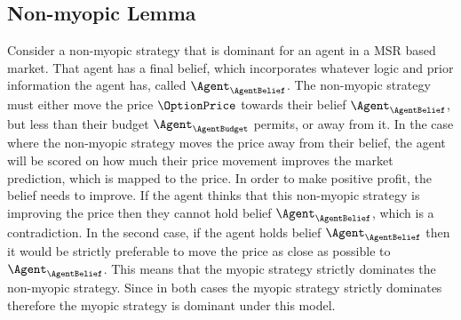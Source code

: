 \subsection{Non-myopic Lemma}
Consider a non-myopic strategy that is dominant for an agent in a MSR based market. That agent has a final belief, which incorporates whatever logic and prior information the agent has, called $\Agent_\AgentBelief$. The non-myopic strategy must either move the price $\OptionPrice$ towards their belief $\Agent_\AgentBelief$, but less than their budget $\Agent_\AgentBudget$ permits, or away from it. In the case where the non-myopic strategy moves the price away from their belief, the agent will be scored on how much their price movement improves the market prediction, which is mapped to the price. In order to make positive profit, the belief needs to improve. If the agent thinks that this non-myopic strategy is improving the price then they cannot hold belief $\Agent_\AgentBelief$, which is a contradiction. In the second case, if the agent holds belief $\Agent_\AgentBelief$ then it would be strictly preferable to move the price as close as possible to $\Agent_\AgentBelief$. This means that the myopic strategy strictly dominates the non-myopic strategy. Since in both cases the myopic strategy strictly dominates therefore the myopic strategy is dominant under this model.\\